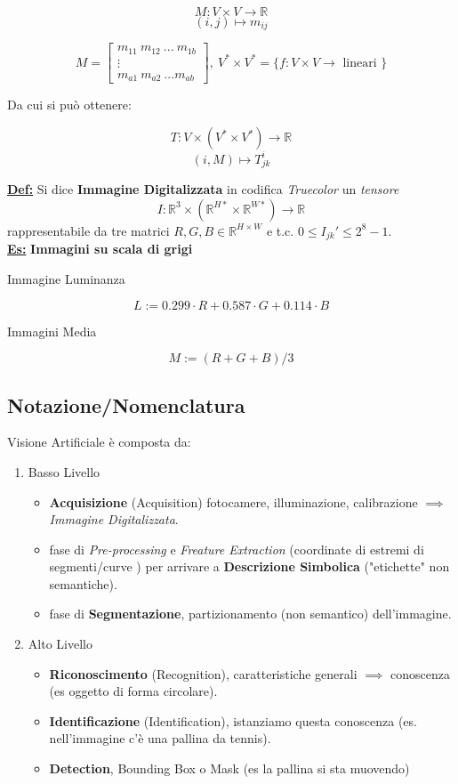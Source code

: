 \documentclass[a4paper,12pt]{article}
\newcommand{\definizione}{\noindent\textbf{\underline{Def:}} }
\newcommand{\esempio}{\noindent\textbf{\underline{Es:}} }
\begin{document}
	\[
	M : V \times V \rightarrow \mathbb{R}
	\]
	\[
	(i,j) \mapsto m_{ij}
	\]

	\[
	M = \begin{bmatrix}
		m_{11} \ m_{12} \ ... \ m_{1b} \\
		\vdots \\
		m_{a1} \ m_{a2} \ ...  m_{ab}
	\end{bmatrix}, \ V^* \times V^* = \{ f : V \times V \rightarrow \text{ lineari } \}
	\]

	Da cui si può ottenere:

	\[
	T : V \times ( V^* \times V^* ) \rightarrow \mathbb{R}
	\]
	\[
	(i, M) \mapsto T_{jk}^i
	\]

	\definizione Si dice \textbf{Immagine Digitalizzata} in codifica \textit{Truecolor} un \textit{tensore}
	\[
	I : \mathbb{R}^3 \times ( \mathbb{R}^{H*} \times \mathbb{R}^{W*}) \rightarrow \mathbb{R}
	\]
	rappresentabile da tre matrici $R,G,B \in \mathbb{R}^{H \times W}$ e t.c. $0  \leq I_{jk}' \leq 2^8 - 1$. \\

	\esempio \textbf{Immagini su scala di grigi}

	Immagine Luminanza

	\[
	L := 0.299 \cdot R + 0.587 \cdot G + 0.114 \cdot B
	\]

	Immagini Media

	\[
	M := (R + G + B)/3
	\]

	\subsection{Notazione/Nomenclatura}

	Visione Artificiale è composta da:
	\begin{enumerate}
		\item Basso Livello
		\begin{itemize}
			\item \textbf{Acquisizione} (Acquisition) fotocamere, illuminazione, calibrazione $\implies$ \textit{Immagine Digitalizzata}.
			\item fase di \textit{Pre-processing} e \textit{Freature Extraction} (coordinate di estremi di segmenti/curve ) per arrivare a \textbf{Descrizione Simbolica} ("etichette" non semantiche).
			\item fase di \textbf{Segmentazione}, partizionamento (non semantico) dell'immagine.
		\end{itemize}
		\item Alto Livello
		\begin{itemize}
			\item \textbf{Riconoscimento} (Recognition), caratteristiche generali $\implies$ conoscenza (es oggetto di forma circolare).
			\item \textbf{Identificazione} (Identification), istanziamo questa conoscenza (es. nell'immagine c'è una pallina da tennis).
			\item \textbf{Detection}, Bounding Box o Mask (es la pallina si sta muovendo)
		\end{itemize}
	\end{enumerate}
\end{document}
